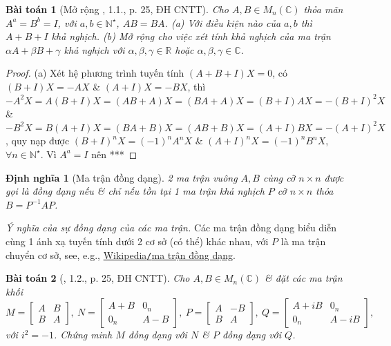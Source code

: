 \documentclass{article}
\newtheorem{baitoan}{Bài toán}
\newtheorem{dinhnghia}{Định nghĩa}
\begin{document}
\begin{baitoan}[Mở rộng \cite{VMS_VMC2024}, 1.1., p. 25, ĐH CNTT]
	Cho $A,B\in M_n(\mathbb{C})$ thỏa mãn $A^a = B^b = I$, với $a,b\in\mathbb{N}^\star$, $AB = BA$. (a) Với điều kiện nào của $a,b$ thì $A + B + I$ khả nghịch. (b) Mở rộng cho việc xét tính khả nghịch của ma trận $\alpha A + \beta B + \gamma$ khả nghịch với $\alpha,\beta,\gamma\in\mathbb{R}$ hoặc $\alpha,\beta,\gamma\in\mathbb{C}$.
\end{baitoan}

\begin{proof}
	(a) Xét hệ phương trình tuyến tính $(A + B + I)X = 0$, có $(B + I)X = -AX$ \& $(A + I)X = -BX$, thì $-A^2X = A(B + I)X = (AB + A)X = (BA + A)X = (B + I)AX = -(B + I)^2X$ \& $-B^2X = B(A + I)X = (BA + B)X = (AB + B)X = (A + I)BX = -(A + I)^2X$, quy nạp được $(B + I)^nX = (-1)^nA^nX$ \& $(A + I)^nX = (-1)^nB^nX$, $\forall n\in\mathbb{N}^\star$. Vì $A^a = I$ nên ***
\end{proof}

\begin{dinhnghia}[Ma trận đồng dạng]
	2 ma trận vuông $A,B$ cùng cỡ $n\times n$ được gọi là {\rm đồng dạng} nếu \& chỉ nếu tồn tại 1 ma trận khả nghịch $P$ cỡ $n\times n$ thỏa $B = P^{-1}AP$.
\end{dinhnghia}
{\it Ý nghĩa của sự đồng dạng của các ma trận.} Các ma trận đồng dạng biểu diễn cùng 1 ánh xạ tuyến tính dưới 2 cơ sở (có thể) khác nhau, với $P$ là ma trận chuyển cơ sở, see, e.g., \href{https://vi.wikipedia.org/wiki/Ma_tr%E1%BA%ADn_%C4%91%E1%BB%93ng_d%E1%BA%A1ng}{Wikipedia{\tt/}ma trận đồng dạng}.

\begin{baitoan}[\cite{VMS_VMC2024}, 1.2., p. 25, ĐH CNTT]
	Cho $A,B\in M_n(\mathbb{C})$ \& đặt các ma trận khối
	\begin{equation*}
		M = \begin{bmatrix}
			A & B\\B & A
		\end{bmatrix},\ N = \begin{bmatrix}
			A + B & 0_n\\0_n & A - B
		\end{bmatrix},\ P = \begin{bmatrix}
			A & -B\\B & A
		\end{bmatrix},\ Q = \begin{bmatrix}
			A + iB & 0_n\\0_n & A - iB
		\end{bmatrix},
	\end{equation*}
	với $i^2 = -1$. Chứng minh $M$ đồng dạng với $N$ \& $P$ đồng dạng với $Q$.
\end{baitoan}
\end{document}
